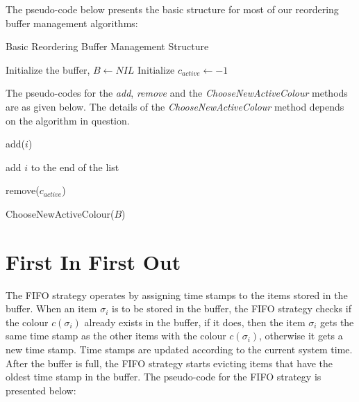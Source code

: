 The pseudo-code below presents the basic structure for most of our reordering buffer management algorithms: 

\begin{algorithm} [ht] 
\caption{Basic Reordering Buffer Management Structure}
\label{basicStructure}
Initialize the buffer, $B \gets NIL$ \;
Initialize $c_{active} \gets -1$ \;
\end{algorithm}

The pseudo-codes for the \textit{add}, \textit{remove} and the \textit{ChooseNewActiveColour} methods are as given below. The details of the \textit{ChooseNewActiveColour} method depends on the algorithm in question. 

\begin{function*} [ht]
\caption{add($i$)}
\label{genadd}
add $i$ to the end of the list \;
\end{function*}

\begin{function*} [ht]
\caption{remove($c_{active}$)}
\label{removemtlc}
\end{function*}

\begin{function*} [ht]
\caption{ChooseNewActiveColour($B$)}
\label{mtlcfunc}
\end{function*}

\section{First In First Out} \label{fifo}
The FIFO strategy operates by assigning time stamps to the items stored in the
buffer. When an item $\sigma_i$ is to be stored in the buffer, the FIFO
strategy checks if the colour $c(\sigma_i)$ already exists in the buffer, if it
does, then the item $\sigma_i$ gets the same time stamp as the other items with
the colour $c(\sigma_i)$, otherwise it gets a new time stamp. Time stamps  are
updated according to the current system time. After the buffer is full, the FIFO 
strategy starts evicting items that have the oldest time stamp in the buffer.
The pseudo-code for the FIFO strategy is presented below: 

